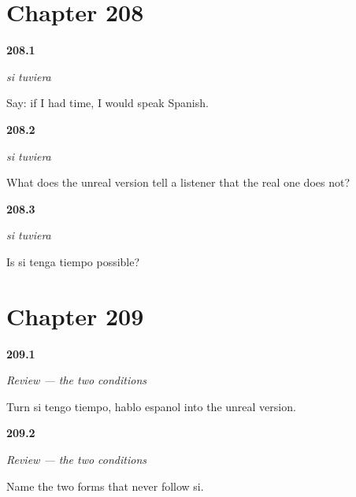 \section*{Chapter 208}

\noindent\begin{minipage}[t]{\linewidth}
\raggedright
\hypertarget{review-ES-C56-si-tuviera-say}{\textbf{208.1}} \emph{si tuviera}\par
\small Say: if I had time, I would speak Spanish.
\end{minipage}\par\medskip

\noindent\begin{minipage}[t]{\linewidth}
\raggedright
\hypertarget{review-ES-C56-si-tuviera-implies}{\textbf{208.2}} \emph{si tuviera}\par
\small What does the unreal version tell a listener that the real one does not?
\end{minipage}\par\medskip

\noindent\begin{minipage}[t]{\linewidth}
\raggedright
\hypertarget{review-ES-C56-si-tuviera-trap}{\textbf{208.3}} \emph{si tuviera}\par
\small Is si tenga tiempo possible?
\end{minipage}\par\medskip

\section*{Chapter 209}

\noindent\begin{minipage}[t]{\linewidth}
\raggedright
\hypertarget{review-ES-C56-repaso-condiciones-shift}{\textbf{209.1}} \emph{Review — the two conditions}\par
\small Turn si tengo tiempo, hablo espanol into the unreal version.
\end{minipage}\par\medskip

\noindent\begin{minipage}[t]{\linewidth}
\raggedright
\hypertarget{review-ES-C56-repaso-condiciones-bans}{\textbf{209.2}} \emph{Review — the two conditions}\par
\small Name the two forms that never follow si.
\end{minipage}\par\medskip

